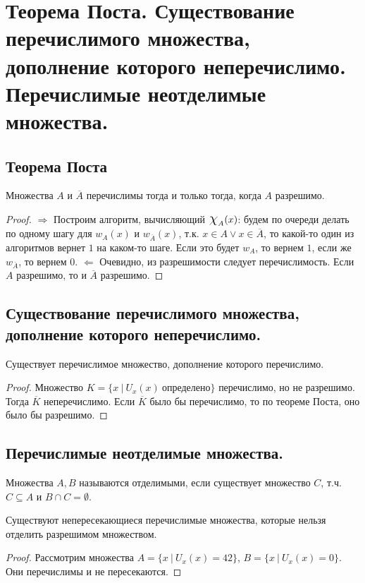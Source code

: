 \section{Теорема Поста. Существование перечислимого множества, дополнение которого неперечислимо. Перечислимые неотделимые множества.}

\subsection{Теорема Поста}

\begin{theorem}
  Множества $A$ и $\overline{A}$ перечислимы тогда и только тогда, когда $A$ разрешимо.
  \begin{proof}
    $\Rightarrow$ \newline
    Построим алгоритм, вычисляющий $\mbox{\Large$\chi$}_A(x)$: будем по очереди делать по одному шагу для $w_A(x)$ и $w_{\overline{A}}(x)$, т.к. $x \in A \vee x \in \overline{A}$, то какой-то один из алгоритмов вернет $1$ на каком-то шаге. Если это будет $w_A$, то вернем $1$, если же $w_{\overline{A}}$, то вернем $0$. \newline
    $\Leftarrow$ \newline
    Очевидно, из разрешимости следует перечислимость. Если $A$ разрешимо, то и $\overline{A}$ разрешимо.
  \end{proof}
\end{theorem}

\subsection{Существование перечислимого множества, дополнение которого неперечислимо.}

\begin{statement}
  Существует перечислимое множество, дополнение которого перечислимо.
  \begin{proof}
    Множество $K = \{x \> | \> U_x(x) \> \textit{определено}\}$ перечислимо, но не разрешимо. Тогда $\overline{K}$ неперечислимо. Если $\overline{K}$ было бы перечислимо, то по теореме Поста, оно было бы разрешимо.
  \end{proof}
\end{statement}


\subsection{Перечислимые неотделимые множества.}

\begin{definition}
  Множества $A, B$ называются отделимыми, если существует множество $C$, т.ч. $C \subseteq A$ и $B \cap C = \emptyset$.
\end{definition}

\begin{statement}
  Существуют непересекающиеся перечислимые множества, которые нельзя отделить разрешимом множеством.
  \begin{proof}
    Рассмотрим множества $A = \{x \> | \> U_x(x) = 42\}$, $B = \{x \> | \> U_x(x) = 0\}$. Они перечислимы и не пересекаются. 
  \end{proof}
\end{statement}